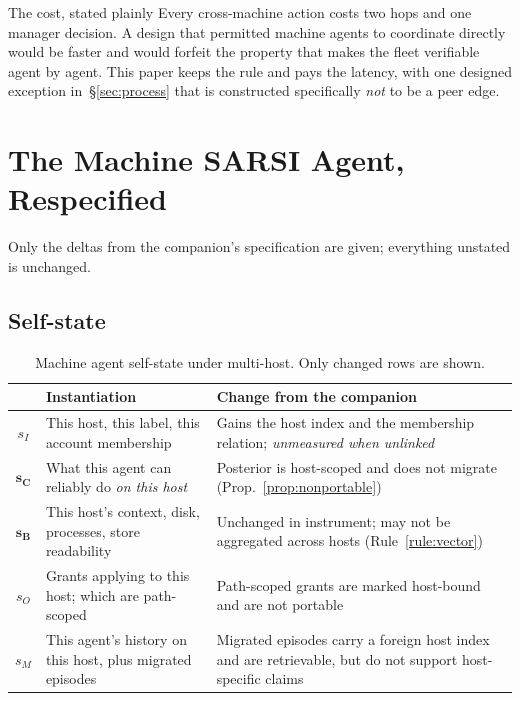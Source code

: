 \documentclass[11pt]{article}
\begin{document}
\begin{cautionbox}{The cost, stated plainly}
Every cross-machine action costs two hops and one manager decision. A design that permitted machine agents to coordinate directly would be faster and would forfeit the property that makes the fleet verifiable agent by agent. This paper keeps the rule and pays the latency, with one designed exception in~\S\ref{sec:process} that is constructed specifically \emph{not} to be a peer edge.
\end{cautionbox}

\section{The Machine SARSI Agent, Respecified}
\label{sec:machine}

Only the deltas from the companion's specification are given; everything unstated is unchanged.

\subsection{Self-state}

\begin{table}[h]
\centering\small
\caption{Machine agent self-state under multi-host. Only changed rows are shown.}
\label{tab:mac-state}
\begin{tabular}{@{}cL{5.4cm}L{6.6cm}@{}}
\toprule
& \textbf{Instantiation} & \textbf{Change from the companion} \\
\midrule
$s_I$ & This host, this label, this account membership & Gains the host index and the membership relation; \emph{unmeasured when unlinked} \\
$\mathbf{s_C}$ & What this agent can reliably do \emph{on this host} & Posterior is host-scoped and does not migrate (Prop.~\ref{prop:nonportable}) \\
$\mathbf{s_B}$ & This host's context, disk, processes, store readability & Unchanged in instrument; may not be aggregated across hosts (Rule~\ref{rule:vector}) \\
$s_O$ & Grants applying to this host; which are path-scoped & Path-scoped grants are marked host-bound and are not portable \\
$s_M$ & This agent's history on this host, plus migrated episodes & Migrated episodes carry a foreign host index and are retrievable, but do not support host-specific claims \\
\bottomrule
\end{tabular}
\end{table}
\end{document}
